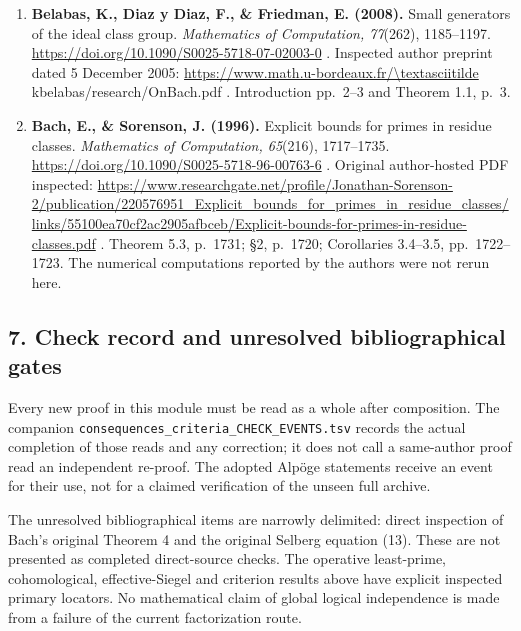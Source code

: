 \documentclass[11pt,a4paper]{article}
\theoremstyle{definition}\newtheorem{definition}[theorem]{Definition}
\theoremstyle{remark}\newtheorem{remark}[theorem]{Remark}
\begin{document}
\begin{enumerate}
  . Original PDF inspected. The theorem's explicit absence of an RH
  assumption was checked.
\item
  \textbf{Belabas, K., Diaz y Diaz, F., \& Friedman, E. (2008).} Small
  generators of the ideal class group. \emph{Mathematics of Computation,
  77}(262), 1185--1197. \url{https://doi.org/10.1090/S0025-5718-07-02003-0} .
  Inspected author preprint dated 5 December 2005:
  \url{https://www.math.u-bordeaux.fr/\textasciitilde} kbelabas/research/OnBach.pdf
  . Introduction pp.~2--3 and Theorem 1.1, p.~3.
\item
  \textbf{Bach, E., \& Sorenson, J. (1996).} Explicit bounds for primes
  in residue classes. \emph{Mathematics of Computation, 65}(216),
  1717--1735. \url{https://doi.org/10.1090/S0025-5718-96-00763-6} . Original
  author-hosted PDF inspected:
  \url{https://www.researchgate.net/profile/Jonathan-Sorenson-2/publication/220576951\_Explicit\_bounds\_for\_primes\_in\_residue\_classes/links/55100ea70cf2ac2905afbceb/Explicit-bounds-for-primes-in-residue-classes.pdf}
  . Theorem 5.3, p.~1731; §2, p.~1720; Corollaries 3.4--3.5,
  pp.~1722--1723. The numerical computations reported by the authors
  were not rerun here.
\end{enumerate}

\subsection{7. Check record and unresolved bibliographical
gates}\label{check-record-and-unresolved-bibliographical-gates}

Every new proof in this module must be read as a whole after
composition. The companion
\nolinkurl{consequences_criteria_CHECK_EVENTS.tsv} records the actual
completion of those reads and any correction; it does not call a
same-author proof read an independent re-proof. The adopted Alpöge
statements receive an event for their use, not for a claimed
verification of the unseen full archive.

The unresolved bibliographical items are narrowly delimited: direct
inspection of Bach's original Theorem 4 and the original Selberg
equation (13). These are not presented as completed direct-source
checks. The operative least-prime, cohomological, effective-Siegel and
criterion results above have explicit inspected primary locators. No
mathematical claim of global logical independence is made from a failure
of the current factorization route.

\end{document}
